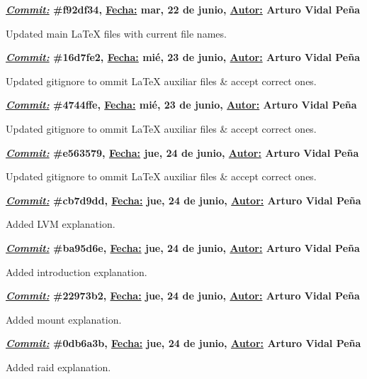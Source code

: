 \item \textbf{\underline{\textit{Commit:}} \#f92df34, \underline{Fecha:} mar, 22 de junio, \underline{Autor:} Arturo Vidal Peña}\\\item[] Updated main LaTeX files with current file names.\\
\item \textbf{\underline{\textit{Commit:}} \#16d7fe2, \underline{Fecha:} mié, 23 de junio, \underline{Autor:} Arturo Vidal Peña}\\\item[] Updated gitignore to ommit LaTeX auxiliar files \& accept correct ones.\\
\item \textbf{\underline{\textit{Commit:}} \#4744ffe, \underline{Fecha:} mié, 23 de junio, \underline{Autor:} Arturo Vidal Peña}\\\item[] Updated gitignore to ommit LaTeX auxiliar files \& accept correct ones.\\
\item \textbf{\underline{\textit{Commit:}} \#e563579, \underline{Fecha:} jue, 24 de junio, \underline{Autor:} Arturo Vidal Peña}\\\item[] Updated gitignore to ommit LaTeX auxiliar files \& accept correct ones.\\
\item \textbf{\underline{\textit{Commit:}} \#cb7d9dd, \underline{Fecha:} jue, 24 de junio, \underline{Autor:} Arturo Vidal Peña}\\\item[] Added LVM explanation.\\
\item \textbf{\underline{\textit{Commit:}} \#ba95d6e, \underline{Fecha:} jue, 24 de junio, \underline{Autor:} Arturo Vidal Peña}\\\item[] Added introduction explanation.\\
\item \textbf{\underline{\textit{Commit:}} \#22973b2, \underline{Fecha:} jue, 24 de junio, \underline{Autor:} Arturo Vidal Peña}\\\item[] Added mount explanation.\\
\item \textbf{\underline{\textit{Commit:}} \#0db6a3b, \underline{Fecha:} jue, 24 de junio, \underline{Autor:} Arturo Vidal Peña}\\\item[] Added raid explanation.\\
